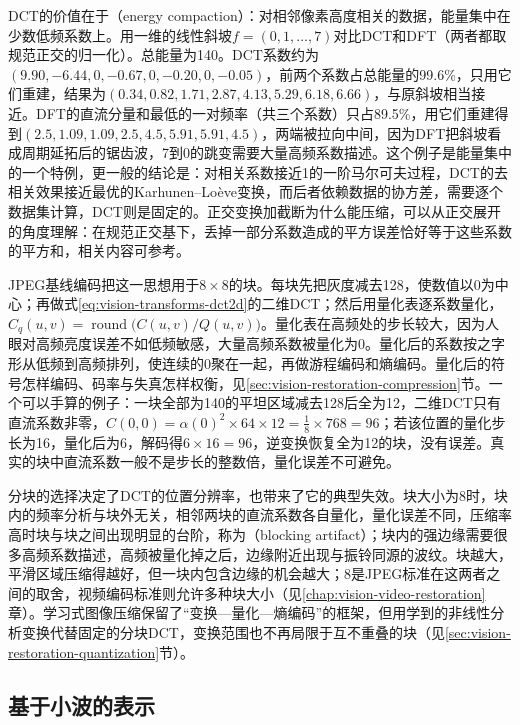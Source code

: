 DCT的价值在于（energy compaction）：对相邻像素高度相关的数据，能量集中在少数低频系数上。用一维的线性斜坡$f=(0,1,\ldots,7)$对比DCT和DFT（两者都取规范正交的归一化）。总能量为140。DCT系数约为$(9.90,-6.44,0,-0.67,0,-0.20,0,-0.05)$，前两个系数占总能量的99.6\%，只用它们重建，结果为$(0.34,0.82,1.71,2.87,4.13,5.29,6.18,6.66)$，与原斜坡相当接近。DFT的直流分量和最低的一对频率（共三个系数）只占89.5\%，用它们重建得到$(2.5,1.09,1.09,2.5,4.5,5.91,5.91,4.5)$，两端被拉向中间，因为DFT把斜坡看成周期延拓后的锯齿波，7到0的跳变需要大量高频系数描述。这个例子是能量集中的一个特例，更一般的结论是：对相关系数接近1的一阶马尔可夫过程，DCT的去相关效果接近最优的Karhunen–Loève变换，而后者依赖数据的协方差，需要逐个数据集计算，DCT则是固定的。正交变换加截断为什么能压缩，可以从正交展开的角度理解：在规范正交基下，丢掉一部分系数造成的平方误差恰好等于这些系数的平方和，相关内容可参考。

JPEG基线编码把这一思想用于$8\times8$的块。每块先把灰度减去128，使数值以0为中心；再做式\eqref{eq:vision-transforms-dct2d}的二维DCT；然后用量化表逐系数量化，$C_q(u,v)=\operatorname{round}\bigl(C(u,v)/Q(u,v)\bigr)$。量化表在高频处的步长较大，因为人眼对高频亮度误差不如低频敏感，大量高频系数被量化为0。量化后的系数按之字形从低频到高频排列，使连续的0聚在一起，再做游程编码和熵编码。量化后的符号怎样编码、码率与失真怎样权衡，见\ref{sec:vision-restoration-compression}节。一个可以手算的例子：一块全部为140的平坦区域减去128后全为12，二维DCT只有直流系数非零，$C(0,0)=\alpha(0)^2\times64\times12=\tfrac18\times768=96$；若该位置的量化步长为16，量化后为6，解码得$6\times16=96$，逆变换恢复全为12的块，没有误差。真实的块中直流系数一般不是步长的整数倍，量化误差不可避免。

分块的选择决定了DCT的位置分辨率，也带来了它的典型失效。块大小为8时，块内的频率分析与块外无关，相邻两块的直流系数各自量化，量化误差不同，压缩率高时块与块之间出现明显的台阶，称为（blocking artifact）；块内的强边缘需要很多高频系数描述，高频被量化掉之后，边缘附近出现与振铃同源的波纹。块越大，平滑区域压缩得越好，但一块内包含边缘的机会越大；8是JPEG标准在这两者之间的取舍，视频编码标准则允许多种块大小（见\ref{chap:vision-video-restoration}章）。学习式图像压缩保留了“变换—量化—熵编码”的框架，但用学到的非线性分析变换代替固定的分块DCT，变换范围也不再局限于互不重叠的块（见\ref{sec:vision-restoration-quantization}节）。

\subsection{基于小波的表示}
\label{sec:vision-transforms-wavelet}

